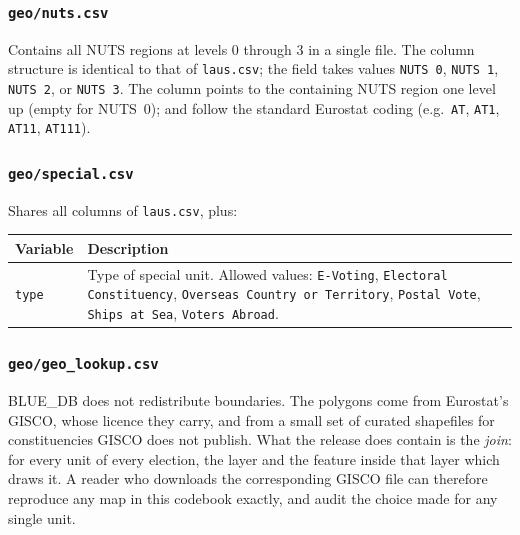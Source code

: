 \subsubsection{\texttt{geo/nuts.csv}}

Contains all NUTS regions at levels 0 through 3 in a single file.
The column structure is identical to that of \texttt{laus.csv}; the
 field takes values \texttt{NUTS~0}, \texttt{NUTS~1},
\texttt{NUTS~2}, or \texttt{NUTS~3}.
The  column points to the containing NUTS region one
level up (empty for NUTS~0);  and  follow the
standard Eurostat coding (e.g.\ \texttt{AT}, \texttt{AT1}, \texttt{AT11},
\texttt{AT111}).

\subsubsection{\texttt{geo/special.csv}}

Shares all columns of \texttt{laus.csv}, plus:

\begin{longtable}{p{2.5cm}p{12.5cm}}
\toprule
\textbf{Variable} & \textbf{Description} \\
\midrule
\endhead
\texttt{type} & Type of special unit.  Allowed values:
\texttt{E-Voting}, \texttt{Electoral Constituency},
\texttt{Overseas Country or Territory}, \texttt{Postal Vote},
\texttt{Ships at Sea}, \texttt{Voters Abroad}. \\
\bottomrule
\end{longtable}

\subsubsection{\texttt{geo/geo\_lookup.csv}}
\label{sec:geo_lookup}

BLUE\_DB does not redistribute boundaries.  The polygons come from Eurostat's
GISCO, whose licence they carry, and from a small set of curated shapefiles for
constituencies GISCO does not publish.  What the release does contain is the
\emph{join}: for every unit of every election, the layer and the feature inside
that layer which draws it.  A reader who downloads the corresponding GISCO file
can therefore reproduce any map in this codebook exactly, and audit the choice
made for any single unit.

